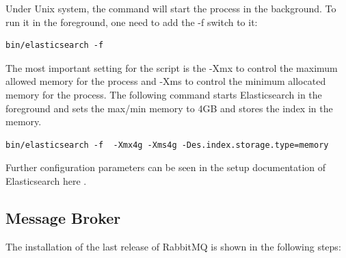 Under Unix system, the command will start the process in the background. To run it in the foreground, one need to add the -f switch to it:
\begin{code}
\begin{verbatim}
bin/elasticsearch -f
\end{verbatim}
\end{code}

The most important setting for the script is the -Xmx to control the maximum allowed memory for the process and -Xms to control the minimum allocated memory for the process. The following command starts Elasticsearch in the foreground and sets the max/min memory to 4GB and stores the index in the memory. 
\begin{code}
\begin{verbatim}
bin/elasticsearch -f  -Xmx4g -Xms4g -Des.index.storage.type=memory
\end{verbatim}
\end{code}

Further configuration parameters can be seen in the setup documentation of Elasticsearch here \cite{elastic_setup}.

\subsection{Message Broker\label{sec:eval_te_mb}}
The installation of the last release of RabbitMQ is shown in the following steps:

